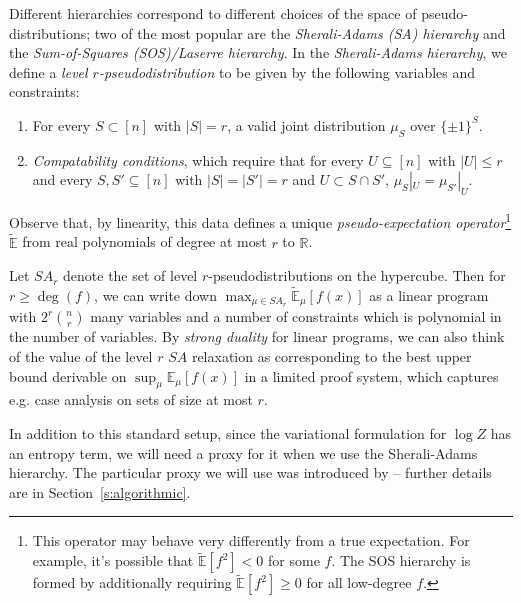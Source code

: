 \documentclass[11pt, oneside, english]{article}
\newcommand{\bE}{\mathbb{E}}
\newcommand{\E}{\bE}      %
\DeclareMathOperator{\poly}{poly}
\theoremstyle{definition}
\theoremstyle{plain}
\begin{document}
Different hierarchies correspond to different choices of the space of pseudo-distributions; two of the most popular are the \emph{Sherali-Adams (SA) hierarchy} and the \emph{Sum-of-Squares (SOS)/Laserre hierarchy}. %
In the \emph{Sherali-Adams hierarchy}, we define a \emph{level $r$-pseudodistribution} to be given by the following variables and constraints:
\begin{enumerate}
\item For every $S \subset [n]$ with $|S| = r$, a valid joint distribution $\mu_S$ over $\{\pm 1\}^S$.
\item \emph{Compatability conditions}, which require that for every $U \subseteq [n]$ with $|U| \le r$ and every $S,S'\subseteq [n]$ with $|S|=|S'|=r$ and $U \subset S \cap S'$, $\mu_S|_U = \mu_{S'}|_U$. 
\end{enumerate}
Observe that, by linearity, this data defines a unique \emph{pseudo-expectation operator}\footnote{This operator may behave very differently from a true expectation. For example, it's possible that $\tilde{\E}[f^2] < 0$ for some $f$. The SOS hierarchy is formed by additionally requiring $\tilde{\E}[f^2] \ge 0$ for all low-degree $f$.} $\tilde{\E}$ from real polynomials of degree at most $r$ to $\mathbb{R}$. 

Let $SA_r$ denote the set of level $r$-pseudodistributions on the hypercube.
Then for $r \ge \deg(f)$, we can write down $\max_{\mu \in SA_r} \tilde{\E}_{\mu}[f(x)]$ as a linear program with $2^r {n \choose r}$ many variables and a number of constraints which is polynomial in the number of variables. 
By \emph{strong duality} for linear programs, we can also think of the value of the level $r$ $SA$ relaxation as corresponding to the best upper bound derivable on $\sup_{\mu} \E_{\mu}[f(x)]$ in a limited proof system, which captures e.g. case analysis on sets of size at most $r$.

In addition to this standard setup, since the variational formulation for $\log Z$ has an entropy term, we will need a proxy for it when we use the Sherali-Adams hierarchy. The particular proxy we will use was introduced by \cite{risteski2016calculate} -- further details are in Section~\ref{s:algorithmic}.  
\end{document}
